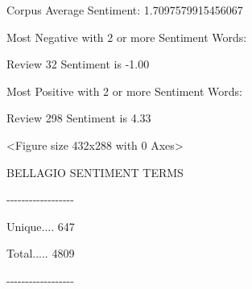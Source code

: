 \hfill\break

Corpus Average Sentiment: 1.7097579915456067

\hfill\break

Most Negative with 2 or more Sentiment Words:

Review 32 Sentiment is -1.00

\hfill\break

Most Positive with 2 or more Sentiment Words:

Review 298 Sentiment is 4.33

\textless Figure size 432x288 with 0 Axes\textgreater{}

\hfill\break

BELLAGIO SENTIMENT TERMS

-\/-\/-\/-\/-\/-\/-\/-\/-\/-\/-\/-\/-\/-\/-\/-\/-\/-

Unique.... 647

Total..... 4809

-\/-\/-\/-\/-\/-\/-\/-\/-\/-\/-\/-\/-\/-\/-\/-\/-\/-

\hfill\break
